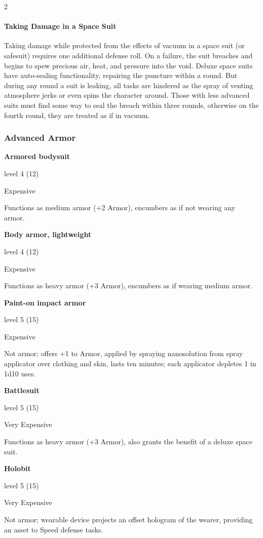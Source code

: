 \begin{multicols}{2}
\paragraph{Taking Damage in a Space Suit}

Taking damage while protected from the effects of vacuum in a space suit (or safesuit) requires one additional defense roll. On a failure, the suit breaches and begins to spew precious air, heat, and pressure into the void. Deluxe space suits have auto-sealing functionality, repairing the puncture within a round. But during any round a suit is leaking, all tasks are hindered as the spray of venting atmosphere jerks or even spins the character around. Those with less advanced suits must find some way to seal the breach within three rounds, otherwise on the fourth round, they are treated as if in vacuum.

\subsubsection{Advanced Armor}

\textbf{Armored bodysuit} 

level 4 (12) 

Expensive 

Functions as medium armor (+2 Armor), encumbers as if not wearing any armor. 

\textbf{Body armor, lightweight}

level 4 (12) 

Expensive 

Functions as heavy armor (+3 Armor), encumbers as if wearing medium armor. 

\textbf{Paint-on impact armor} 

level 5 (15) 

Expensive 

Not armor; offers +1 to Armor, applied by spraying nanosolution from spray applicator over clothing and skin, lasts ten minutes; each applicator depletes 1 in 1d10 uses. 

\textbf{Battlesuit} 

level 5 (15) 

Very Expensive 

Functions as heavy armor (+3 Armor), also grants the benefit of a deluxe space suit. 

\textbf{Holobit} 

level 5 (15) 

Very Expensive 

Not armor; wearable device projects an offset hologram of the wearer, providing an asset to Speed defense tasks. 


\end{multicols}
